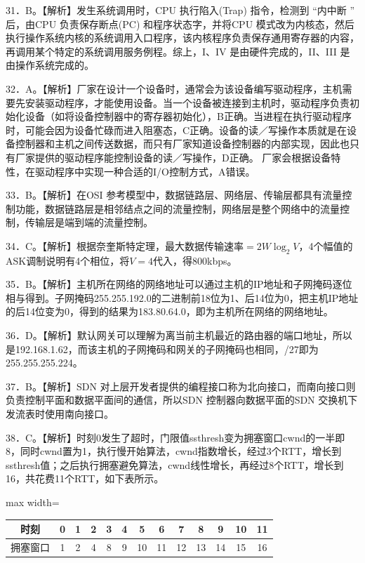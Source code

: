 \documentclass[UTF8,11pt]{ctexart}
\begin{document}
31．B。【解析】发生系统调用时，CPU 执行陷入(Trap) 指令，检测到 “内中断 ” 后，由CPU 负责保存断点(PC) 和程序状态字，并将CPU 模式改为内核态，然后执行操作系统内核的系统调用入口程序，该内核程序负责保存通用寄存器的内容，再调用某个特定的系统调用服务例程。综上，I、IV 是由硬件完成的，II、III 是由操作系统完成的。


32．A。【解析】厂家在设计一个设备时，通常会为该设备编写驱动程序，主机需要先安装驱动程序，才能使用设备。当一个设备被连接到主机时，驱动程序负责初始化设备（如将设备控制器中的寄存器初始化），B正确。当进程在执行驱动程序时，可能会因为设备忙碌而进入阻塞态，C正确。设备的读／写操作本质就是在设备控制器和主机之间传送数据，而只有厂家知道设备控制器的内部实现，因此也只有厂家提供的驱动程序能控制设备的读／写操作，D正确。 厂家会根据设备特性，在驱动程序中实现一种合适的I/O控制方式，A错误。


33．B。【解析】在OSI 参考模型中，数据链路层、网络层、传输层都具有流量控制功能，数据链路层是相邻结点之间的流量控制，网络层是整个网络中的流量控制，传输层是端到端的流量控制。


34．C。【解析】根据奈奎斯特定理，最大数据传输速率\(\displaystyle =2W\log_2V\)，4个幅值的ASK调制说明有4个相位，将\(\displaystyle V=4\)代入，得800kbps。


35．B。【解析】主机所在网络的网络地址可以通过主机的IP地址和子网掩码逐位相与得到。子网掩码255.255.192.0的二进制前18位为1、后14位为0，把主机IP地址的后14位变为0，得到的结果为183.80.64.0，即为主机所在网络的网络地址。


36．D。【解析】默认网关可以理解为离当前主机最近的路由器的端口地址，所以是192.168.1.62，而该主机的子网掩码和网关的子网掩码也相同，/27即为255.255.255.224。


37．B。【解析】SDN 对上层开发者提供的编程接口称为北向接口，而南向接口则负责控制平面和数据平面间的通信，所以SDN 控制器向数据平面的SDN 交换机下发流表时使用南向接口。


38．C。【解析】时刻0发生了超时，门限值ssthresh变为拥塞窗口cwnd的一半即8，同时cwnd置为1，执行慢开始算法，cwnd指数增长，经过3个RTT，增长到ssthresh值；之后执行拥塞避免算法，cwnd线性增长，再经过8个RTT，增长到16，共花费11个RTT，如下表所示。


\begin{center}\begin{adjustbox}{max width=\linewidth}\begin{tabular}{|c|c|c|c|c|c|c|c|c|c|c|c|c|}\hline
时刻 & 0 & 1 & 2 & 3 & 4 & 5 & 6 & 7 & 8 & 9 & 10 & 11\\\hline
拥塞窗口 & 1 & 2 & 4 & 8 & 9 & 10 & 11 & 12 & 13 & 14 & 15 & 16\\\hline\end{tabular}\end{adjustbox}\end{center}
\end{document}
